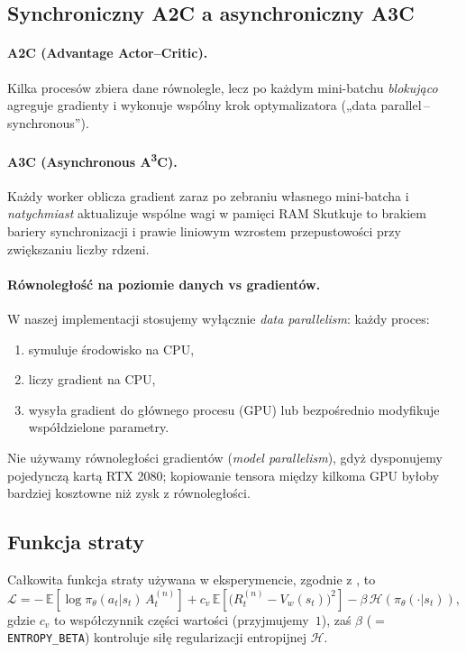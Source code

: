 \documentclass[12pt,a4paper]{article}
\newcommand{\E}{\mathbb{E}}
\begin{document}
\subsection{Synchroniczny A2C a asynchroniczny A3C}

\paragraph{A2C (Advantage Actor–Critic).}
Kilka procesów zbiera dane równolegle, lecz po każdym
mini-batchu \emph{blokująco} agreguje gradienty i wykonuje
wspólny krok optymalizatora („data parallel\,–\,synchronous”).

\paragraph{A3C (Asynchronous A\textsuperscript{3}C).}
Każdy worker oblicza gradient
zaraz po zebraniu własnego mini-batcha
i \emph{natychmiast} aktualizuje wspólne wagi w pamięci RAM
Skutkuje to brakiem bariery synchronizacji i prawie liniowym wzrostem
przepustowości przy zwiększaniu liczby rdzeni.

\paragraph{Równoległość na poziomie danych vs gradientów.}
W naszej implementacji stosujemy wyłącznie
\emph{data parallelism}: każdy proces:
\begin{enumerate}
  \item symuluje środowisko na CPU,
  \item liczy gradient na CPU,
  \item wysyła gradient do głównego procesu (GPU) lub
        bezpośrednio modyfikuje współdzielone parametry.
\end{enumerate}
Nie używamy równoległości gradientów
(\emph{model parallelism}),
gdyż dysponujemy pojedynczą kartą RTX 2080; kopiowanie tensora
między kilkoma GPU byłoby bardziej kosztowne niż zysk z równoległości.

\subsection{Funkcja straty}

Całkowita funkcja straty używana w eksperymencie, zgodnie
z
, to
\begin{equation}
  \mathcal{L}
  = -\,\E\!\left[\log\pi_\theta(a_t|s_t)\,A^{(n)}_t\right]
    +c_v\,\E\!\left[\bigl(R^{(n)}_t-V_w(s_t)\bigr)^2\right]
    -\beta\,\mathcal{H}\!\left(\pi_\theta(\cdot|s_t)\right),
\end{equation}
gdzie $c_v$ to współczynnik części wartości (przyjmujemy~$1$),
zaś $\beta$ ($=$\texttt{ENTROPY\_BETA}) kontroluje siłę
regularizacji entropijnej $\mathcal{H}$.
\end{document}
